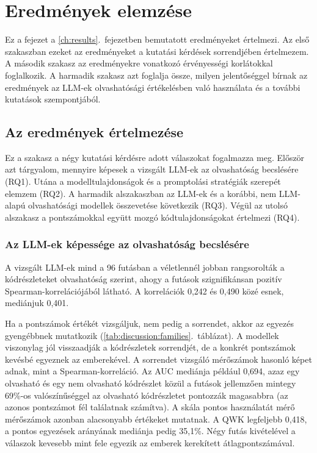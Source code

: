 \documentclass[
]{elteikthesis}[2024/04/26]
\begin{document}
\cleardoublepage











\chapter{Eredmények elemzése}
\label{ch:discussion}

Ez a fejezet a \ref{ch:results}.~fejezetben bemutatott eredményeket értelmezi.
Az első szakaszban ezeket az eredményeket a kutatási kérdések sorrendjében értelmezem.
A második szakasz az eredményekre vonatkozó érvényességi korlátokkal foglalkozik.
A harmadik szakasz azt foglalja össze, milyen jelentőséggel bírnak az eredmények az LLM-ek
olvashatósági értékelésben való használata és a további kutatások szempontjából.

\section{Az eredmények értelmezése}
\label{sec:discussion:interpretation}

Ez a szakasz a négy kutatási kérdésre adott válaszokat fogalmazza meg.
Először azt tárgyalom, mennyire képesek a vizsgált LLM-ek az olvashatóság becslésére (RQ1).
Utána a modelltulajdonságok és a promptolási stratégiák szerepét elemzem (RQ2).
A harmadik alszakaszban az LLM-ek és a korábbi, nem LLM-alapú olvashatósági modellek összevetése következik (RQ3).
Végül az utolsó alszakasz a pontszámokkal együtt mozgó kódtulajdonságokat értelmezi (RQ4).

\subsection{Az LLM-ek képessége az olvashatóság becslésére}
\label{sec:discussion:rq1}

A vizsgált LLM-ek mind a 96 futásban a véletlennél jobban rangsorolták a kódrészleteket olvashatóság szerint,
ahogy a futások szignifikánsan pozitív Spearman-korrelációjából látható.
A korrelációk 0,242 és 0,490 közé esnek, mediánjuk 0,401.

Ha a pontszámok értékét vizsgáljuk, nem pedig a sorrendet, akkor az egyezés gyengébbnek mutatkozik
(\ref{tab:discussion:families}.~táblázat).
A modellek viszonylag jól visszaadják a kódrészletek sorrendjét,
de a konkrét pontszámok kevésbé egyeznek az emberekével.
A sorrendet vizsgáló mérőszámok hasonló képet adnak, mint a Spearman-korreláció.
Az AUC mediánja például 0,694, azaz egy olvasható és egy nem olvasható kódrészlet közül a futások
jellemzően mintegy 69\%-os valószínűséggel az olvasható kódrészletet pontozzák magasabbra
(az azonos pontszámot fél találatnak számítva).
A skála pontos használatát mérő mérőszámok azonban alacsonyabb értékeket mutatnak.
A QWK legfeljebb 0,418, a pontos egyezések arányának mediánja pedig 35,1\%.
Négy futás kivételével a válaszok kevesebb mint fele egyezik az emberek kerekített átlagpontszámával.
\end{document}
